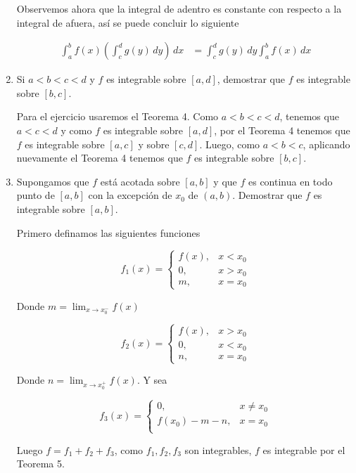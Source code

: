 \documentclass{report}
\begin{document}
\begin{enumerate}
            Observemos ahora que la integral de adentro es constante con respecto a la integral de afuera, así se puede concluir lo siguiente

            \begin{align*}
                \int_{a}^{b}f(x)\left(\int_{c}^{d}g(y)\, dy\right)\, dx &= \int_{c}^{d}g(y)\,dy \int_{a}^{b}f(x)\,dx
            \end{align*}

            \setcounter{enumi}{12}
            \item Si $a < b < c < d$ y $f$ es integrable sobre $[a, d]$, demostrar que $f$ es integrable sobre $[b,c]$.

            Para el ejercicio usaremos el Teorema 4. Como $a < b < c < d$, tenemos que $a<c<d$ y como $f$ es integrable sobre $[a, d]$, por el Teorema 4 tenemos que $f$ es integrable sobre $[a,c]$ y sobre $[c,d]$. Luego, como $a<b<c$, aplicando nuevamente el Teorema 4 tenemos que $f$ es integrable sobre $[b, c]$.

            \setcounter{enumi}{19}
            \item Supongamos que $f$ está acotada sobre $[a,b]$ y que $f$ es continua en todo punto de $[a,b]$ con la excepción de $x_0$ de $(a,b)$. Demostrar que $f$ es integrable sobre $[a,b]$.

            Primero definamos las siguientes funciones

            $$f_1(x) = \begin{cases}
                f(x), & x<x_0\\
                0, & x>x_0\\
                m, & x = x_0
            \end{cases}$$

            Donde $m = \lim_{x \to x_0^-} f(x)$

            $$f_2(x) = \begin{cases}
                f(x), & x>x_0\\
                0, & x<x_0\\
                n, & x = x_0
            \end{cases}$$

            Donde $n = \lim_{x \to x_0^+} f(x)$. Y sea

            $$f_3(x) = \begin{cases}
                0, & x\not=x_0\\
                f(x_0)-m-n, & x=x_0\\
            \end{cases}$$

            Luego $f = f_1 + f_2 + f_3$, como $f_1, f_2, f_3$ son integrables, $f$ es integrable por el Teorema 5.
    \end{enumerate}
\end{document}
